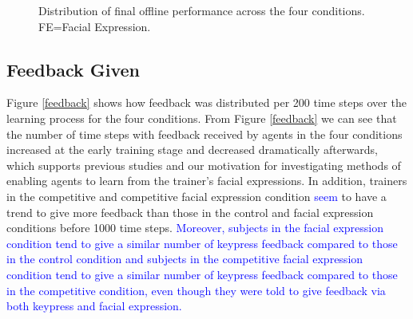 \begin{figure}[htb]
\begin{tabular}{c c c c}
\end{tabular}
\caption{Distribution of final offline performance across the four conditions. FE=Facial Expression.}%
\label{HisFinalOfflinePerformance}
\end{figure}

\subsection{Feedback Given}

Figure \ref{feedback} shows how feedback was distributed per 200 time steps over the learning process for the four conditions. From Figure \ref{feedback} we can see that the number of time steps with feedback received by agents in the four conditions increased at the early training stage and decreased dramatically afterwards, which supports previous studies \cite{knox2012humans,li2013using} and our motivation for investigating methods of enabling agents to learn from the trainer's facial expressions. In addition, trainers in the competitive and competitive facial expression condition \textcolor{blue}{seem} to have a trend to give more feedback than those in the control and facial expression conditions before 1000 time steps. \textcolor{blue}{Moreover, subjects in the facial expression condition tend to give a similar number of keypress feedback compared to those in the control condition and subjects in the competitive facial expression condition tend to give a similar number of keypress feedback compared to those in the competitive condition, even though they were told to give feedback via both keypress and facial expression.}%


